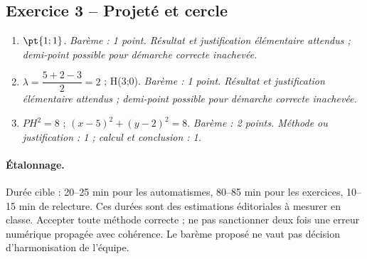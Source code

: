 \subsection*{Exercice 3 -- Projeté et cercle}
\begin{enumerate}
\item $\pt{1;1}$. \textit{Barème : 1 point. Résultat et justification élémentaire attendus ; demi-point possible pour démarche correcte inachevée.}
\item $\lambda =\dfrac{5+2-3}{2}=2$ ; H(3;0). \textit{Barème : 1 point. Résultat et justification élémentaire attendus ; demi-point possible pour démarche correcte inachevée.}
\item $PH^2=8$ ; $(x-5)^2+(y-2)^2=8$. \textit{Barème : 2 points. Méthode ou justification : 1 ; calcul et conclusion : 1.}
\end{enumerate}
\paragraph{Étalonnage.} Durée cible : 20–25 min pour les automatismes, 80–85 min pour les exercices, 10–15 min de relecture. Ces durées sont des estimations éditoriales à mesurer en classe. Accepter toute méthode correcte ; ne pas sanctionner deux fois une erreur numérique propagée avec cohérence. Le barème proposé ne vaut pas décision d’harmonisation de l’équipe.
